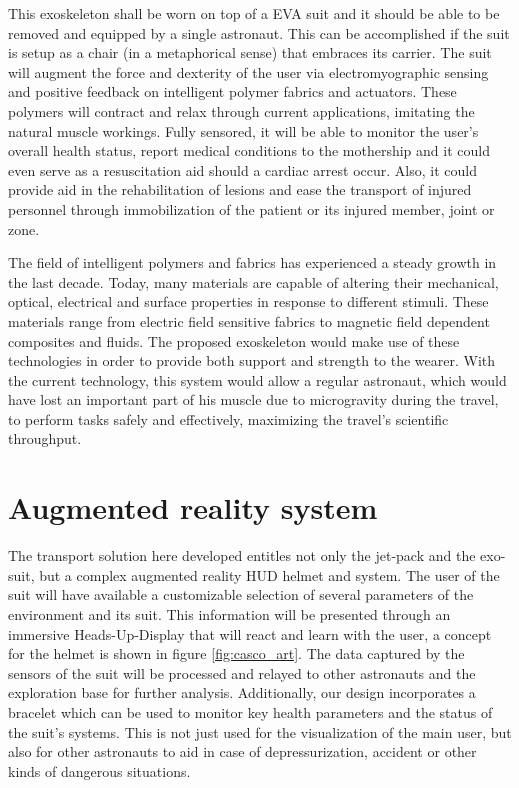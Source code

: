 \documentclass[twocolumn]{article}
\begin{document}
This exoskeleton shall be worn on top of a EVA suit and it should be able to 
be removed and equipped by a single astronaut. This can be accomplished if the 
suit is setup as a chair (in a metaphorical sense) that embraces its carrier.
The suit will augment the force and dexterity of the user via electromyographic 
sensing and positive feedback on intelligent polymer fabrics and actuators. 
These polymers will contract and relax through current applications, imitating 
the natural muscle workings.
Fully sensored, it will be able to monitor the user's overall health status, 
report medical conditions to the mothership and it could even serve as a 
resuscitation aid should a cardiac arrest occur. Also, it could provide aid in 
the rehabilitation of lesions and ease the transport of injured personnel 
through immobilization of the patient or its injured member, joint or zone.

The field of intelligent polymers and fabrics has experienced a steady growth 
in the last decade. Today, many materials are capable of altering their 
mechanical, optical, electrical and surface properties in response to different 
stimuli. These materials range from electric field sensitive  fabrics to 
magnetic field dependent composites and fluids. The proposed exoskeleton would 
make use of these technologies in order to provide both support and strength to 
the wearer.
With the current technology, this system would allow a regular astronaut, which 
would have lost an important part of his muscle due to microgravity during the 
travel, to perform tasks safely and effectively, maximizing the travel's 
scientific throughput.

\section{Augmented reality system}

The transport solution here developed entitles not only the jet-pack and the 
exo-suit, but a complex augmented reality HUD helmet and system. The user of 
the suit will have available a customizable selection of several parameters of 
the environment and its suit. This information will be presented through an 
immersive Heads-Up-Display that will react and learn with the user, a concept 
for the helmet is shown in figure \autoref{fig:casco_art}.
The data captured by the sensors of the suit will be processed and relayed to 
other astronauts and the exploration base for further analysis. Additionally, 
our design incorporates a bracelet which can be used to monitor key health 
parameters and the status of the suit's systems. This is not just used for the 
visualization of the main user, but also for other astronauts to aid in case of 
depressurization, accident or other kinds of dangerous situations.
\end{document}
